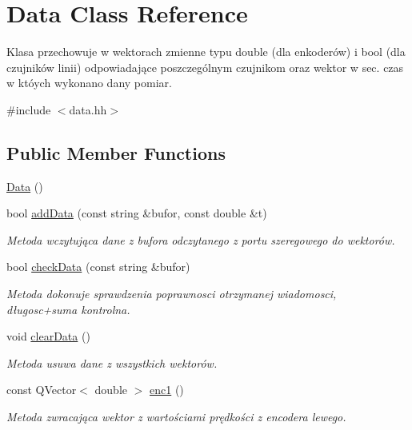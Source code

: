 \hypertarget{class_data}{}\section{Data Class Reference}
\label{class_data}


Klasa przechowuje w wektorach zmienne typu double (dla enkoderów) i bool (dla czujników linii) odpowiadające poszczególnym czujnikom oraz wektor w sec. czas w któych wykonano dany pomiar.  




{\ttfamily \#include $<$data.\+hh$>$}

\subsection*{Public Member Functions}
\begin{DoxyCompactItemize}
\item 
\hyperlink{class_data_af11f741cb7f587e2e495452a8905a22a}{Data} ()
\item 
bool \hyperlink{class_data_a2e824bd41b28fb23a8b6c90b285777ca}{add\+Data} (const string \&bufor, const double \&t)
\begin{DoxyCompactList}\small\item\em Metoda wczytująca dane z bufora odczytanego z portu szeregowego do wektorów. \end{DoxyCompactList}\item 
bool \hyperlink{class_data_ad9b327ea613fc268b8a669b6747aa16e}{check\+Data} (const string \&bufor)
\begin{DoxyCompactList}\small\item\em Metoda dokonuje sprawdzenia poprawnosci otrzymanej wiadomosci, długosc+suma kontrolna. \end{DoxyCompactList}\item 
void \hyperlink{class_data_a644ad8f01a05ab5e995ebc613b2fcab9}{clear\+Data} ()
\begin{DoxyCompactList}\small\item\em Metoda usuwa dane z wszystkich wektorów. \end{DoxyCompactList}\item 
const Q\+Vector$<$ double $>$ \hyperlink{class_data_a852c405041140205ba503309222aa229}{enc1} ()
\begin{DoxyCompactList}\small\item\em Metoda zwracająca wektor z wartościami prędkości z encodera lewego. \end{DoxyCompactList}\item 

\end{DoxyCompactItemize}
